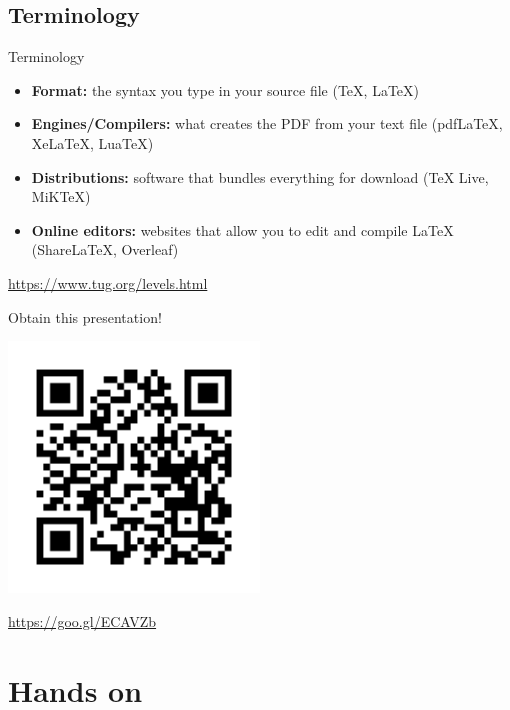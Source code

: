 \documentclass[inputenc]{beamer}
\begin{document}
\subsection{Terminology}

\begin{frame}{Terminology}
    
    \begin{itemize}
        \item \textbf{Format:} the syntax you type in your source file (\TeX{}, \LaTeX{})
        \item \textbf{Engines/Compilers:} what creates the PDF from your text file (pdf\LaTeX{}, Xe\LaTeX{}, Lua\TeX{})
        \item \textbf{Distributions:} software that bundles everything for download (\TeX{} Live, MiK\TeX{})
        \item \textbf{Online editors:} websites that allow you to edit and compile \LaTeX{} (ShareLaTeX, Overleaf)
    \end{itemize}
    
    \vspace{1cm}
    
    \centering
    \url{https://www.tug.org/levels.html}
    
\end{frame}

\begin{frame}{Obtain this presentation!}

    \centering
    \includegraphics[width=0.5\textwidth]{overleaf_QR}
    
    \url{https://goo.gl/ECAVZb}
    
\end{frame}

\section{Hands on}
\end{document}
